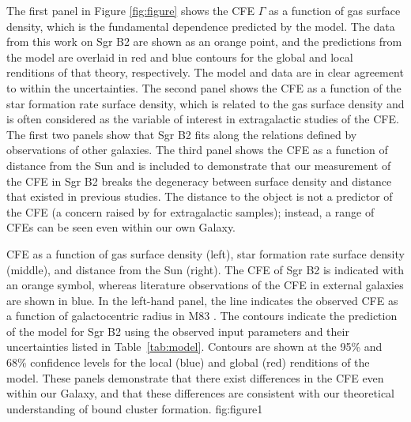 \documentclass[twocolumn]{aastex62}
\begin{document}
The first panel in Figure \ref{fig:figure} shows the CFE $\Gamma$ as a function
of gas surface density, which is the fundamental dependence predicted by the
model. The data from this work on Sgr B2 are shown as an orange point, and the
predictions from the \citet{Kruijssen2012a} model are overlaid in red and blue
contours for the global and local renditions of that theory, respectively. The
model and data are in clear agreement to within the uncertainties. The second
panel shows the CFE as a function of the star formation rate surface density,
which is related to the gas surface density
\citep[e.g.][]{Kennicutt1998a,Bigiel2008a,Leroy2013a} and is often considered
as the variable of interest in extragalactic studies of the CFE. The first two
panels show that Sgr B2 fits along the relations defined by observations of
other galaxies. The third panel shows the CFE as a function of distance from
the Sun and is included to demonstrate that our measurement of the CFE in Sgr
B2 breaks the degeneracy between surface density and distance that existed in
previous studies. The distance to the object is not a predictor of the CFE (a
concern raised by \citealt{Adamo2011a} for extragalactic samples); instead, a
range of CFEs can be seen even within our own Galaxy.

{CFE as a function of gas surface density (left), star formation rate surface
density (middle), and distance from the Sun (right). The CFE of Sgr B2 is
indicated with an orange symbol, whereas literature observations of the CFE in
external galaxies are shown in blue. In the left-hand panel, the line indicates
the observed CFE as a function of galactocentric radius in M83
\citep{Adamo2015a}. The contours indicate the prediction of the
\citet{Kruijssen2012a} model for Sgr B2 using the observed input parameters and
their uncertainties listed in Table~\ref{tab:model}. Contours are shown at the
95\% and 68\% confidence levels for the local (blue) and global (red)
renditions of the model. These panels demonstrate that there exist differences
in the CFE even within our Galaxy, and that these differences are consistent
with our theoretical understanding of bound cluster formation. 
}
{fig:figure}{1}{\textwidth}
\end{document}

